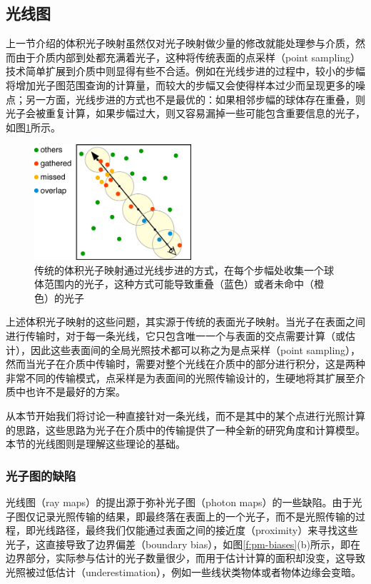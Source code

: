 \subsection{光线图}\label{sec:pm-ray-maps}
上一节介绍的体积光子映射虽然仅对光子映射做少量的修改就能处理参与介质，然而由于介质内部到处都充满着光子，这种将传统表面的点采样（point sampling）技术简单扩展到介质中则显得有些不合适。例如在光线步进的过程中，较小的步幅将增加光子图范围查询的计算量，而较大的步幅又会使得样本过少而呈现更多的噪点；另一方面，光线步进的方式也不是最优的：如果相邻步幅的球体存在重叠，则光子会被重复计算，如果步幅过大，则又容易漏掉一些可能包含重要信息的光子，如图\ref{f:pm-gathering-searches}所示。

\begin{figure}
	\sidecaption
	\includegraphics[width=0.52\textwidth]{figures/pm/gathering-searches}
	\caption{传统的体积光子映射通过光线步进的方式，在每个步幅处收集一个球体范围内的光子，这种方式可能导致重叠（蓝色）或者未命中（橙色）的光子}
	\label{f:pm-gathering-searches}
\end{figure}

上述体积光子映射的这些问题，其实源于传统的表面光子映射。当光子在表面之间进行传输时，对于每一条光线，它只包含唯一一个与表面的交点需要计算（或估计），因此这些表面间的全局光照技术都可以称之为是点采样（point sampling），然而当光子在介质中传输时，需要对整个光线在介质中的部分进行积分，这是两种非常不同的传输模式，点采样是为表面间的光照传输设计的，生硬地将其扩展至介质中也许不是最好的方案。

从本节开始我们将讨论一种直接针对一条光线，而不是其中的某个点进行光照计算的思路，这些思路为光子在介质中的传输提供了一种全新的研究角度和计算模型。本节的光线图则是理解这些理论的基础。




\subsubsection{光子图的缺陷}
光线图（ray maps）\cite{a:RayMapsforGlobalIllumination}的提出源于弥补光子图（photon maps）的一些缺陷。由于光子图仅记录光照传输的结果，即最终落在表面上的一个光子，而不是光照传输的过程，即光线路径，最终我们仅能通过表面之间的接近度（proximity）来寻找这些光子，这直接导致了边界偏差（boundary bias），如图\ref{f:pm-biases}(b)所示，即在边界部分，实际参与估计的光子数量很少，而用于估计计算的面积却没变，这导致光照被过低估计（underestimation），例如一些线状类物体或者物体边缘会变暗。

